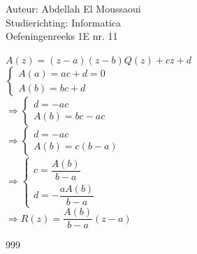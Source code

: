 \documentclass[a4paper]{article}
\begin{document}
  
\noindent \large Auteur: Abdellah El Moussaoui \\
\noindent \large Studierichting: Informatica\\
\noindent \large Oefeningenreeks 1E nr. 11\\

\medskip

\normalsize

\medskip

$A(z)=(z-a)(z-b)Q(z)+cz+d$\\

$\left\{
\begin{array}{l}
A(a)=ac+d=0\\
A(b)=bc+d
\end{array}
\right.$\\

$\Rightarrow
\left\{
\begin{array}{l}
d=-ac\\
A(b)=bc-ac
\end{array}
\right.$\\

$\Rightarrow
\left\{
\begin{array}{l}
d=-ac\\
A(b)=c(b-a)
\end{array}
\right.$\\

$\Rightarrow
\left\{
\begin{array}{l}
c=\dfrac{A(b)}{b-a}\\
d=-\dfrac{aA(b)}{b-a}
\end{array}
\right.$\\

$\Rightarrow R(z)=\dfrac{A(b)}{b-a}(z-a)$\\


\begin{thebibliography}{999}
\end{thebibliography}
\end{document}
